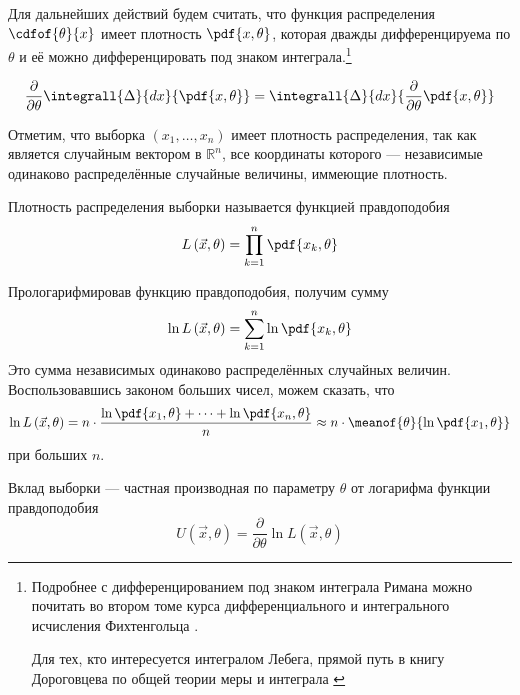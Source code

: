\begin{remark}\label{remark:doubleDiff}
  Для дальнейших действий будем считать, что функция распределения
  $\cdfof{\theta}{x}$ имеет плотность $\pdf{x,\theta}$,
  которая дважды дифференцируема по $\theta$ и её можно дифференцировать под
  знаком интеграла.\footnote{Подробнее с дифференцированием под знаком
  интеграла Римана можно почитать во втором томе курса дифференциального и
  интегрального исчисления Фихтенгольца
  \cite[с.~712]{Fichtenholz2}.

  Для тех, кто интересуется интегралом Лебега, прямой путь в книгу
  Дороговцева по общей теории меры и интеграла \cite[с.~102]{DorogovtsevIT}}

  \begin{equation*}
    \frac{\partial}{\partial \theta}\integrall{\Delta}{dx}{\pdf{x, \theta}}
    = \integrall{\Delta}{dx}{\frac{\partial}{\partial \theta}\pdf{x, \theta}}
  \end{equation*}
\end{remark}

Отметим, что выборка $\left( x_1, \dots, x_n \right)$ имеет плотность
распределения, так как является случайным вектором в $\mathbb{R}^n$,
все координаты которого --- независимые одинаково распределённые случайные
величины, иммеющие плотность.

\begin{definition}
  \label{def:likehoodFunction}
  Плотность распределения выборки называется функцией правдоподобия
  \begin{equation*}
    L\left( \vec{x}, \theta \right) = \prod_{k=1}^n \pdf{x_k, \theta}
  \end{equation*}
\end{definition}

Прологарифмировав функцию правдоподобия, получим сумму
\begin{equation*}
  \ln{L\left( \vec{x}, \theta \right)}
  = \sum_{k=1}^n \ln{\pdf{x_k, \theta}}
\end{equation*}
Это сумма независимых одинаково распределённых случайных величин.
Воспользовавшись законом больших чисел, можем сказать,
что
\begin{equation*}
  \ln{L\left( \vec{x}, \theta \right)}
  = n\cdot\frac{\ln{\pdf{x_1, \theta}} + \dots + \ln{\pdf{x_n, \theta}}}{n}
  \approx n\cdot\meanof{\theta}{\ln{\pdf{x_1, \theta}}}
\end{equation*}
при больших $n$.


\begin{definition}\label{def:defU}
  Вклад выборки --- частная производная по параметру $\theta$
  от логарифма функции правдоподобия
  $$U\left( \vec{x},\theta \right)
      = \frac{\partial}{\partial\theta}\ln{L\left(\vec{x},\theta\right)}$$
\end{definition}

